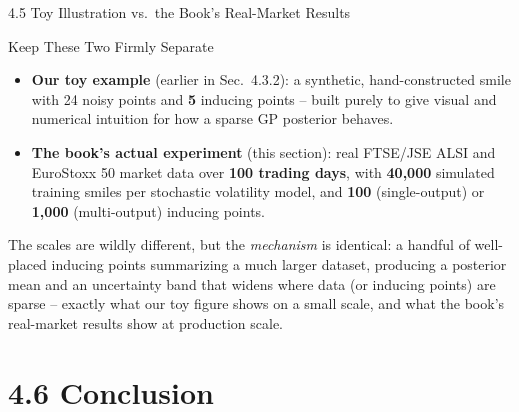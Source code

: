 \documentclass[aspectratio=169,10pt]{beamer}
\begin{document}
\begin{frame}{4.5 Toy Illustration vs.\ the Book's Real-Market Results}
  \begin{block}{Keep These Two Firmly Separate}
    \begin{itemize}
      \item \textbf{Our toy example} (earlier in Sec.\ 4.3.2): a
            synthetic, hand-constructed smile with 24 noisy points and
            \textbf{5} inducing points -- built purely to give visual and
            numerical intuition for how a sparse GP posterior behaves.
      \item \textbf{The book's actual experiment} (this section): real
            FTSE/JSE ALSI and EuroStoxx 50 market data over
            \textbf{100 trading days}, with \textbf{40{,}000} simulated
            training smiles per stochastic volatility model, and
            \textbf{100} (single-output) or \textbf{1{,}000}
            (multi-output) inducing points.
    \end{itemize}
  \end{block}
  The scales are wildly different, but the \emph{mechanism} is identical:
  a handful of well-placed inducing points summarizing a much larger
  dataset, producing a posterior mean and an uncertainty band that
  widens where data (or inducing points) are sparse -- exactly what our
  toy figure shows on a small scale, and what the book's real-market
  results show at production scale.
\end{frame}

\section{4.6 Conclusion}
\end{document}
